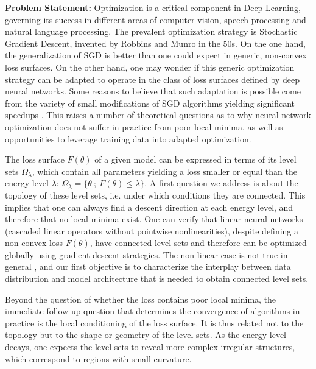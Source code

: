 \documentclass[11pt]{article}
\begin{document}
\vspace{0.5cm}
\noindent
\textbf{Problem Statement:}
Optimization is a critical component in Deep Learning, governing its success in different areas of computer vision, speech processing and natural language processing. The prevalent optimization strategy is Stochastic Gradient Descent, invented by Robbins and Munro in the 50s. On the one hand, the generalization of SGD is better than one could expect 
in generic, non-convex loss surfaces. On the other hand, one may wonder if this generic optimization strategy can be adapted to operate in the class of loss surfaces defined by deep neural networks. Some reasons to believe that such adaptation is possible come from the 
variety of small modifications of SGD algorithms yielding significant speedups \cite{adagrad, rmsprop, adam}.
This raises a number of theoretical questions as to why neural network optimization does not suffer in practice from poor local minima, as well as opportunities to leverage training data into adapted optimization. 

The loss surface $F(\theta)$ of a given model can be expressed in terms of its level sets $\Omega_\lambda$, which contain all parameters yielding a loss smaller or equal than the energy level $\lambda$: $\Omega_\lambda = \{ \theta ~;~F(\theta) \leq \lambda\}$. 
A first question we address is about the topology of these level sets, i.e. under which conditions they are connected. This implies that one can always find a descent direction at each energy level, and therefore that no local minima exist. One can verify that linear neural networks (cascaded linear operators without pointwise nonlinearities), despite defining a non-convex loss $F(\theta)$, have connected level sets and therefore can be optimized globally using gradient descent strategies. The non-linear case is not true in general \cite{shamir}, and our first objective is to characterize the interplay between data distribution and model architecture that is needed to obtain connected level sets. 

Beyond the question of whether the loss contains poor local minima, the immediate follow-up question that determines the convergence of algorithms in practice is the local conditioning of the loss surface. It is thus related not to the topology but to the shape or geometry of the level sets. As the energy level decays, one expects the level sets to reveal more complex irregular structures, which correspond to regions with small curvature.
\end{document}
